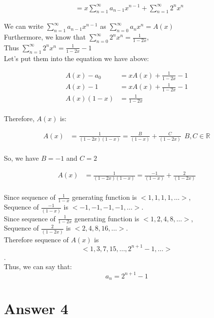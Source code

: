 \documentclass[12pt]{article}
\begin{document}
\begin{align*}
&= x\sum_{n=1}^{\infty} a_{n-1} x^{n-1} + \sum_{n=1}^{\infty} 2^n x^n
\end{align*}

We can write \( \sum_{n=1}^{\infty} a_{n-1} x^{n-1}\) as \( \sum_{n=0}^{\infty} a_{n} x^{n} = A(x) \) \\

Furthermore, we know that  \( \sum_{n=0}^{\infty} 2^n x^n = \frac{1}{1-2x} \),\\

Thus \( \sum_{n=1}^{\infty} 2^n x^n = \frac{1}{1-2x} - 1\)\\

Let's put them into the equation we have above:

\begin{align*}
A(x)-a_{0} &= xA(x) + \frac{1}{1-2x} - 1\\
A(x)-1 &= xA(x) + \frac{1}{1-2x} - 1\\
A(x)(1-x) &= \frac{1}{1-2x}\\
\end{align*}

Therefore, \( A(x) \) is:

\begin{align*}
A(x)&= \frac{1}{(1-2x)(1-x)} = \frac{B}{(1-x)} + \frac{C}{(1-2x)}  \ \ B,C \in \mathbb{R}\\
\end{align*}

So, we have \( B=-1\) and \(C=2\)

\begin{align*}
A(x)&= \frac{1}{(1-2x)(1-x)} = \frac{-1}{(1-x)} + \frac{2}{(1-2x)}  \\
\end{align*}

Since sequence of \( \frac{1}{1-x} \) generating function is \( <1, 1, 1, 1, \dots> \),\\

Sequence of \(\frac{-1}{(1-x)}\) is \( <-1, -1, -1, -1, \dots> \).\\

Since sequence of \( \frac{1}{1-2x} \) generating function is \( <1, 2, 4, 8, \dots> \),\\

Sequence of \(\frac{2}{(1-2x)}\) is \( <2, 4, 8, 16, \dots> \).\\

Therefore sequence of \( A(x) \) is \[ <1, 3, 7, 15, \dots, 2^{n+1}-1 , \dots>\].\\
Thus, we can say that: \[ a_n = 2^{n+1}-1\]



\section*{Answer 4}
\end{document}
